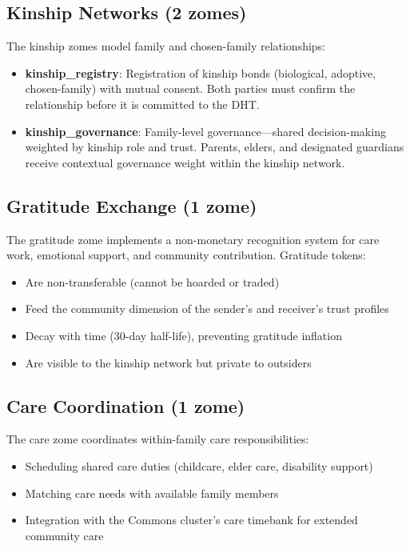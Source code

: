 \documentclass[12pt]{book}
\begin{document}
\subsection{Kinship Networks (2 zomes)}

The kinship zomes model family and chosen-family relationships:

\begin{itemize}
  \item \textbf{kinship\_registry}: Registration of kinship bonds (biological,
    adoptive, chosen-family) with mutual consent. Both parties must confirm
    the relationship before it is committed to the DHT.
  \item \textbf{kinship\_governance}: Family-level governance---shared
    decision-making weighted by kinship role and trust. Parents, elders, and
    designated guardians receive contextual governance weight within the kinship
    network.
\end{itemize}

\subsection{Gratitude Exchange (1 zome)}

The gratitude zome implements a non-monetary recognition system for care work,
emotional support, and community contribution. Gratitude tokens:

\begin{itemize}
  \item Are non-transferable (cannot be hoarded or traded)
  \item Feed the community dimension of the sender's and receiver's trust profiles
  \item Decay with time (30-day half-life), preventing gratitude inflation
  \item Are visible to the kinship network but private to outsiders
\end{itemize}

\subsection{Care Coordination (1 zome)}

The care zome coordinates within-family care responsibilities:

\begin{itemize}
  \item Scheduling shared care duties (childcare, elder care, disability support)
  \item Matching care needs with available family members
  \item Integration with the Commons cluster's care timebank for extended
    community care
\end{itemize}
\end{document}
